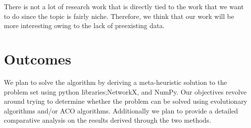 \documentclass[a4paper,11pt]{article}
\begin{document}
There is not a lot of research work that is directly tied to the work that 
we want to do since the topic is fairly niche. Therefore, we think that our work will be more interesting owing to the lack of preexisting data. 
\section{Outcomes}
We plan to solve the algorithm by deriving a meta-heuristic solution to the problem set using python libraries;NetworkX, and NumPy. Our objectives revolve around trying to  determine whether the problem can be solved using evolutionary algorithms and/or ACO algorithms. Additionally we plan to provide a detailed comparative analysis on the results derived through the two methods.



\end{document}
